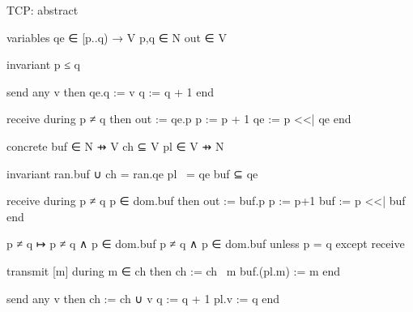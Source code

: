 

TCP: 
	abstract

variables
	qe ∈ [p..q) → V
	p,q ∈ N
	out ∈ V

invariant
	p ≤ q

send
	any v
	then
		qe.q := v
		q := q + 1
	end

receive
	during
		p ≠ q
	then
		out := qe.p
		p := p + 1
		qe := {p} <<| qe
	end

concrete
	buf ∈ N ⇸ V
	ch ⊆ V
	pl ∈ V ⇸ N

invariant
	ran.buf ∪ ch = ran.qe
	pl~ = qe
	buf ⊆ qe

receive
	during
		p ≠ q
		p ∈ dom.buf
	then
		out := buf.p
		p := p+1
		buf := {p} <<| buf
	end

p ≠ q ↦ p ≠ q ∧ p ∈ dom.buf
p ≠ q ∧ p ∈ dom.buf unless p = q except receive

transmit [m]
	during
		m ∈ ch
	then
		ch := ch \ {m}
		buf.(pl.m) := m
	end

send
	any v
	then
		ch := ch ∪ {v}
		q := q + 1
		pl.v := q
	end

